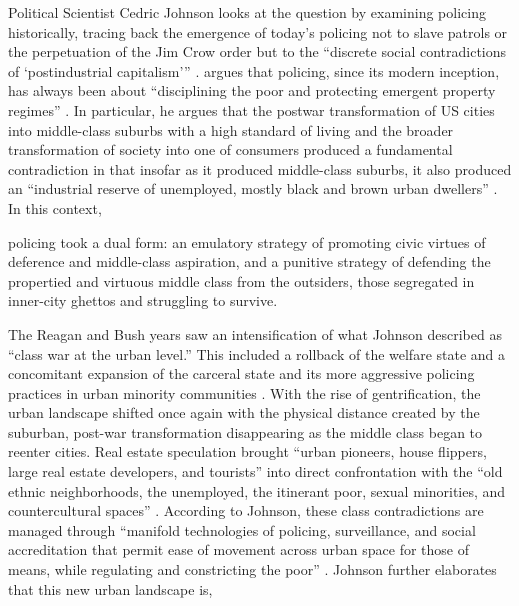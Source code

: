 \documentclass[12pt]{article}
\renewenvironment{quote}
  {\list{}{\leftmargin=\parindent\rightmargin=0pt}%
   \item\relax}
  {\endlist}
\begin{document}

Political Scientist Cedric Johnson looks at the question by examining policing historically, tracing back the emergence of today’s policing not to slave patrols or the perpetuation of the Jim Crow order but to the “discrete social contradictions of ‘postindustrial capitalism’” \parencite*[171]{johnsonTrumpismPolicingProblem2019}. \citeauthor{johnsonTrumpismPolicingProblem2019} argues that policing, since its modern inception, has always been about “disciplining the poor and protecting emergent property regimes” \parencite*[172]{johnsonTrumpismPolicingProblem2019}. In particular, he argues that the postwar transformation of US cities into middle-class suburbs with a high standard of living and the broader transformation of society into one of consumers produced a fundamental contradiction in that insofar as it produced middle-class suburbs, it also produced an “industrial reserve of unemployed, mostly black and brown urban dwellers” \parencite*[171]{johnsonTrumpismPolicingProblem2019}. In this context,

\begin{quote}
policing took a dual form: an emulatory strategy of promoting civic virtues of deference and middle-class aspiration, and a punitive strategy of defending the propertied and virtuous middle class from the outsiders, those segregated in inner-city ghettos and struggling to survive. \parencite[176]{johnsonTrumpismPolicingProblem2019}
\end{quote}

The Reagan and Bush years saw an intensification of what Johnson described as “class war at the urban level.” This included a rollback of the welfare state and a concomitant expansion of the carceral state and its more aggressive policing practices in urban minority communities \parencites[177]{johnsonTrumpismPolicingProblem2019}{johnsonBlackLivesMatter2023}. With the rise of gentrification, the urban landscape shifted once again with the physical distance created by the suburban, post-war transformation disappearing as the middle class began to reenter cities. Real estate speculation brought “urban pioneers, house flippers, large real estate developers, and tourists” into direct confrontation with the “old ethnic neighborhoods, the unemployed, the itinerant poor, sexual minorities, and countercultural spaces” \parencite[177]{johnsonTrumpismPolicingProblem2019}. According to Johnson, these class contradictions are managed through “manifold technologies of policing, surveillance, and social accreditation that permit ease of movement across urban space for those of means, while regulating and constricting the poor” \parencite*[178]{johnsonTrumpismPolicingProblem2019}. Johnson further elaborates that this new urban landscape is,
\end{document}
